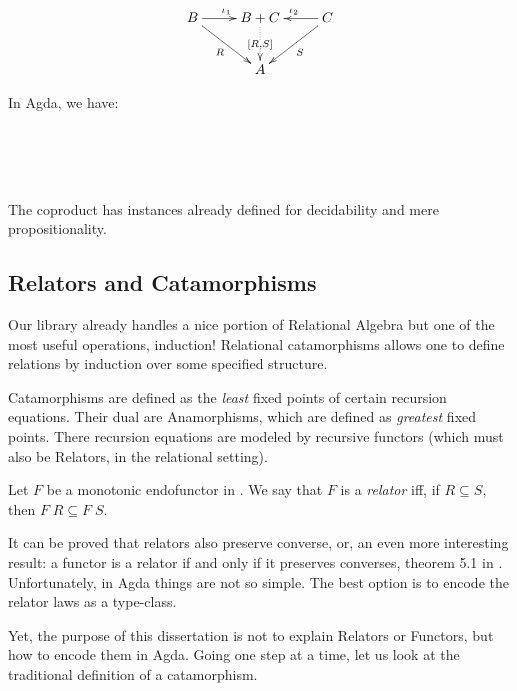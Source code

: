 \begin{displaymath}
\xymatrix{%
 B \ar[r]^{\iota_1} \ar[dr]_{R} & B + C \ar@{..>}[d]|{[R , S]} & C \ar[l]_{\iota_2} \ar[dl]^{S} \\
   &   A   &
}
\end{displaymath}

In Agda, we have:

\\
\\
\\

The coproduct has instances already defined for decidability and mere propositionality.

\subsection{Relators and Catamorphisms}

Our library already handles a nice portion of Relational Algebra but one of the most
useful operations, induction! Relational catamorphisms allows one to define relations
by induction over some specified structure. 

Catamorphisms are defined as the \emph{least} fixed points of certain recursion equations. Their
dual are Anamorphisms, which are defined as \emph{greatest} fixed points. There recursion equations
are modeled by recursive functors (which must also be Relators, in the relational setting).\\

\begin{mydef}[Relator]
Let $F$ be a monotonic endofunctor in . We say that $F$ is a \emph{relator}
iff, if $R \subseteq S$, then $F\;R \subseteq F\;S$.
\end{mydef}

It can be proved that relators also preserve converse, or, an even more interesting result: a functor
is a relator if and only if it preserves converses, theorem 5.1 in \cite{Bird97}. Unfortunately,
in Agda things are not so simple. The best option is to encode the relator laws as a type-class.


Yet, the purpose of this dissertation is not to explain Relators or Functors, but how to encode them
in Agda. Going one step at a time, let us look at the traditional definition of a catamorphism.

